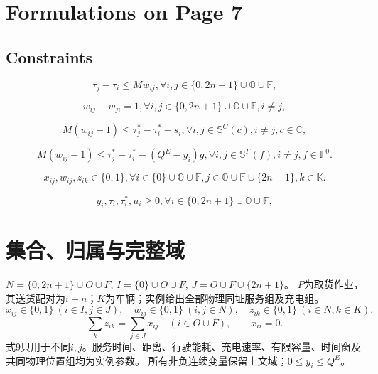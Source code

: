 \documentclass[11pt]{ctexart}
\begin{document}
\newpage

\section{Formulations on Page 7}

\subsection{Constraints}
\begin{equation}
    \label{eq:24}
    \tau_j - \tau_i \le M w_{ij}, \forall i, j \in \{0, 2n + 1\} \cup \mathbb{O} \cup \mathbb{F}, \tag{24}
\end{equation}

\begin{equation}
    \label{eq:25}
    w_{ij} + w_{ji} = 1, \forall i, j \in \{0, 2n + 1\} \cup \mathbb{O} \cup \mathbb{F}, i \neq j, \tag{25}
\end{equation}

\begin{equation}
    \label{eq:26}
    M(w_{ij} - 1) \le \tau_j^* - \tau_i^* - s_i, \forall i, j \in \mathbb{S}^C(c), i \neq j, c \in \mathbb{C}, \tag{26}
\end{equation}

\begin{equation}
    \label{eq:27}
    M(w_{ij} - 1) \le \tau_j^* - \tau_i^* - (Q^E - y_i)g, \forall i, j \in \mathbb{S}^F(f), i \neq j, f \in \mathbb{F}^0. \tag{27}
\end{equation}

\begin{equation}
    \label{eq:28}
    x_{ij}, w_{ij}, z_{ik} \in \{0, 1\}, \forall i \in \{0\} \cup \mathbb{O} \cup \mathbb{F}, j \in \mathbb{O} \cup \mathbb{F} \cup \{2n + 1\}, k \in \mathbb{K}. \tag{28}
\end{equation}

\begin{equation}
    \label{eq:29}
    y_i, \tau_i, \tau_i^*, u_i \ge 0, \forall i \in \{0, 2n + 1\} \cup \mathbb{O} \cup \mathbb{F}, \tag{29}
\end{equation}



\section*{集合、归属与完整域}
$N=\{0,2n+1\}\cup O\cup F$, $I=\{0\}\cup O\cup F$, $J=O\cup F\cup\{2n+1\}$。
$P$为取货作业，其送货配对为$i+n$；$K$为车辆；实例给出全部物理同址服务组及充电组。
\[
x_{ij}\in\{0,1\}\ (i\in I,j\in J),\quad
w_{ij}\in\{0,1\}\ (i,j\in N),\quad z_{ik}\in\{0,1\}\ (i\in N,k\in K).
\]
\[
\sum_kz_{ik}=\sum_{j\in J}x_{ij}\quad(i\in O\cup F),\qquad x_{ii}=0.
\]
式9只用于不同$i,j$。服务时间、距离、行驶能耗、充电速率、有限容量、时间窗及共同物理位置组均为实例参数。
所有非负连续变量保留上文域；$0\le y_i\le Q^E$。
\end{document}
